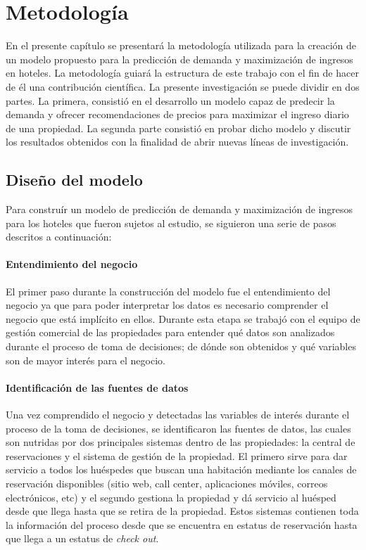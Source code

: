 \chapter{Metodología}
\label{ch:metodologia}

En el presente capítulo se presentará la metodología utilizada para la creación de un modelo propuesto para la predicción de demanda y maximización de ingresos en hoteles. La metodología guiará la estructura de este trabajo con el fin de hacer de él una contribución científica. La presente investigación se puede dividir en dos partes. La primera, consistió en el desarrollo un modelo capaz de predecir la demanda y ofrecer recomendaciones de precios para maximizar el ingreso diario de una propiedad. La segunda parte consistió en probar dicho modelo y discutir los resultados obtenidos con la finalidad de abrir nuevas líneas de investigación.

\section*{Diseño del modelo}

Para construír un modelo de predicción de demanda y maximización de ingresos para los hoteles que fueron sujetos al estudio, se siguieron una serie de pasos descritos a continuación:

\subsubsection*{Entendimiento del negocio}

El primer paso durante la construcción del modelo fue el entendimiento del negocio ya que para poder interpretar los datos es necesario comprender el negocio que está implícito en ellos. Durante esta etapa se trabajó con el equipo de gestión comercial de las propiedades para entender qué datos son analizados durante el proceso de toma de decisiones; de dónde son obtenidos y qué variables son de mayor interés para el negocio.

\subsubsection*{Identificación de las fuentes de datos}

Una vez comprendido el negocio y detectadas las variables de interés durante el proceso de la toma de decisiones, se identificaron las fuentes de datos, las cuales son nutridas por dos principales sistemas dentro de las propiedades: la central de reservaciones y el sistema de gestión de la propiedad. El primero sirve para dar servicio a todos los huéspedes que buscan una habitación mediante los canales de reservación disponibles (sitio web, call center, aplicaciones móviles, correos electrónicos, etc) y el segundo gestiona la propiedad y dá servicio al huésped desde que llega hasta que se retira de la propiedad. Estos sistemas contienen toda la información del proceso desde que se encuentra en estatus de reservación hasta que llega a un estatus de \emph{check out}.

